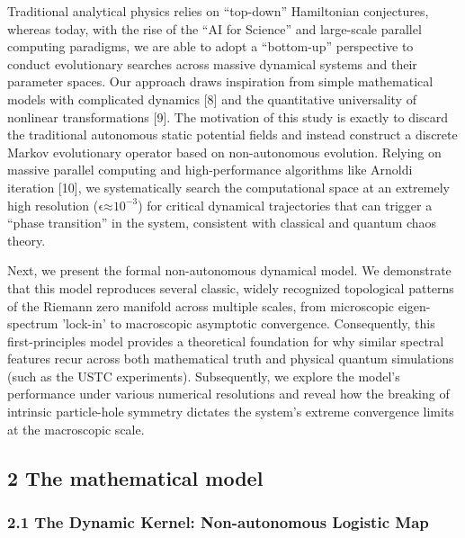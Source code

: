 Traditional analytical physics relies on ``top-down'' Hamiltonian
conjectures, whereas today, with the rise of the ``AI for Science'' and
large-scale parallel computing paradigms, we are able to adopt a
``bottom-up'' perspective to conduct evolutionary searches across
massive dynamical systems and their parameter spaces. Our approach draws
inspiration from simple mathematical models with complicated dynamics
{[}8{]} and the quantitative universality of nonlinear transformations
{[}9{]}. The motivation of this study is exactly to discard the
traditional autonomous static potential fields and instead construct a
discrete Markov evolutionary operator based on non-autonomous evolution.
Relying on massive parallel computing and high-performance algorithms
like Arnoldi iteration {[}10{]}, we systematically search the
computational space at an extremely high resolution
(\(\text{ϵ≈}\text{10}^{\text{−3}}\)) for critical dynamical trajectories
that can trigger a ``phase transition'' in the system, consistent with
classical and quantum chaos theory.

Next, we present the formal non-autonomous dynamical model. We
demonstrate that this model reproduces several classic, widely
recognized topological patterns of the Riemann zero manifold across
multiple scales, from microscopic eigen-spectrum 'lock-in' to
macroscopic asymptotic convergence. Consequently, this first-principles
model provides a theoretical foundation for why similar spectral
features recur across both mathematical truth and physical quantum
simulations (such as the USTC experiments). Subsequently, we explore the
model's performance under various numerical resolutions and reveal how
the breaking of intrinsic particle-hole symmetry dictates the system's
extreme convergence limits at the macroscopic scale.

\hypertarget{the-mathematical-model}{%
\subsection{\texorpdfstring{\textbf{2 The mathematical
model}}{2 The mathematical model}}\label{the-mathematical-model}}

\hypertarget{the-dynamic-kernel-non-autonomous-logistic-map}{%
\subsubsection{\texorpdfstring{\textbf{2.1 The Dynamic Kernel:
Non-autonomous Logistic
Map}}{2.1 The Dynamic Kernel: Non-autonomous Logistic Map}}\label{the-dynamic-kernel-non-autonomous-logistic-map}}

